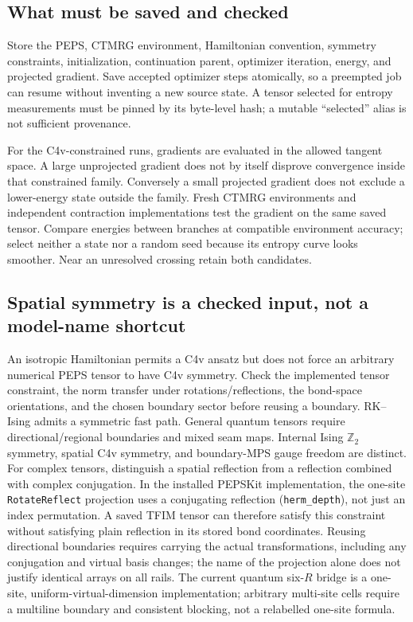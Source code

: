 \documentclass[11pt]{article}
\newcommand{\code}[1]{{\small\nolinkurl{#1}}}
\begin{document}
\ifdetailed
\subsection{What must be saved and checked}
Store the PEPS, CTMRG environment, Hamiltonian convention, symmetry constraints,
initialization, continuation parent, optimizer iteration, energy, and projected
gradient. Save accepted optimizer steps atomically, so a preempted job can
resume without inventing a new source state. A tensor selected for entropy
measurements must be pinned by its byte-level hash; a mutable ``selected''
alias is not sufficient provenance.

For the C4v-constrained runs, gradients are evaluated in the allowed tangent
space. A large unprojected gradient does not by itself disprove convergence
inside that constrained family. Conversely a small projected gradient does
not exclude a lower-energy state outside the family. Fresh CTMRG environments
and independent contraction implementations test the gradient on the same
saved tensor. Compare energies between branches at compatible environment
accuracy; select neither a state nor a random seed because its entropy curve
looks smoother. Near an unresolved crossing retain both candidates.

\subsection{Spatial symmetry is a checked input, not a model-name shortcut}
An isotropic Hamiltonian permits a C4v ansatz but does not force an arbitrary
numerical PEPS tensor to have C4v symmetry. Check the implemented tensor
constraint, the norm transfer under rotations/reflections, the bond-space
orientations, and the chosen boundary sector before reusing a boundary.
RK--Ising admits a symmetric fast path. General quantum tensors require
directional/regional boundaries and mixed seam maps. Internal Ising $\mathbb Z_2$
symmetry, spatial C4v symmetry, and boundary-MPS gauge freedom are distinct.
For complex tensors, distinguish a spatial reflection from a reflection
combined with complex conjugation. In the installed PEPSKit implementation,
the one-site \code{RotateReflect} projection uses a conjugating reflection
(\code{herm\_depth}), not just an index permutation. A saved TFIM tensor
can therefore satisfy this constraint without satisfying plain reflection
in its stored bond coordinates. Reusing directional boundaries requires
carrying the actual transformations, including any conjugation and virtual
basis changes; the name of the projection alone does not justify identical
arrays on all rails.
The current quantum six-$R$ bridge is a one-site, uniform-virtual-dimension
implementation; arbitrary multi-site cells require a multiline boundary and
consistent blocking, not a relabelled one-site formula.
\fi
\end{document}

